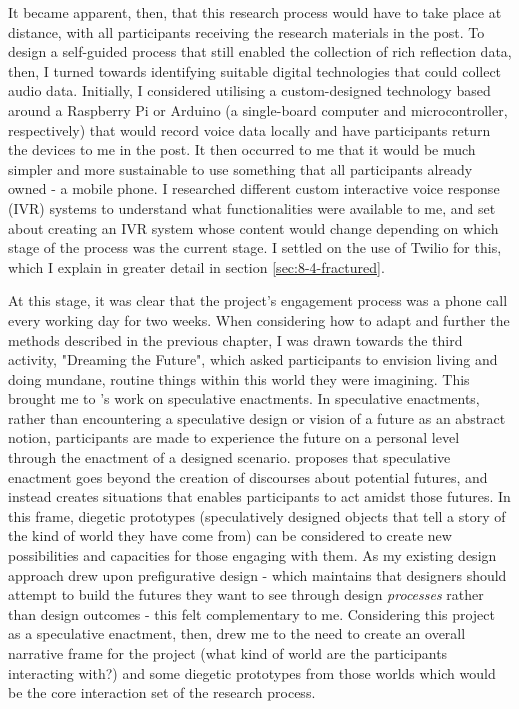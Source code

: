 It became apparent, then, that this research process would have to take place at distance, with all participants receiving the research materials in the post. To design a self-guided process that still enabled the collection of rich reflection data, then, I turned towards identifying suitable digital technologies that could collect audio data. Initially, I considered utilising a custom-designed technology based around a Raspberry Pi or Arduino (a single-board computer and microcontroller, respectively) that would record voice data locally and have participants return the devices to me in the post. It then occurred to me that it would be much simpler and more sustainable to use something that all participants already owned - a mobile phone. I researched different custom interactive voice response (IVR) systems to understand what functionalities were available to me, and set about creating an IVR system whose content would change depending on which stage of the process was the current stage. I settled on the use of Twilio for this, which I explain in greater detail in section \ref{sec:8-4-fractured}. 

At this stage, it was clear that the project's engagement process was a phone call every working day for two weeks. When considering how to adapt and further the methods described in the previous chapter, I was drawn towards the third activity, "Dreaming the Future", which asked participants to envision living and doing mundane, routine things within this world they were imagining. This brought me to \citet{elsden_speculative_2017}'s work on speculative enactments. In speculative enactments, rather than encountering a speculative design or vision of a future as an abstract notion, participants are made to experience the future on a personal level through the enactment of a designed scenario. \citet{elsden_speculative_2017} proposes that speculative enactment goes beyond the creation of discourses about potential futures, and instead creates situations that enables participants to act amidst those futures. In this frame, diegetic prototypes  \citep{kirby_future_2010} (speculatively designed objects that tell a story of the kind of world they have come from) can be considered to create new possibilities and capacities for those engaging with them. As my existing design approach drew upon prefigurative design \citep{asad_prefigurative_2018, asad_prefigurative_2019, asad_tap_2017} - which maintains that designers should attempt to build the futures they want to see through design \textit{processes} rather than design outcomes - this felt complementary to me. Considering this project as a speculative enactment, then, drew me to the need to create an overall narrative frame for the project (what kind of world are the participants interacting with?) and some diegetic prototypes from those worlds which would be the core interaction set of the research process. 

